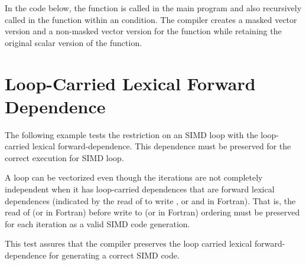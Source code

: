 


In the code below, the function  is called in the main program and 
also recursively called in the function  within an  
condition. The compiler creates a masked vector version and a non-masked vector 
version for the function  while retaining the original scalar 
version of the  function.





\section{Loop-Carried Lexical Forward Dependence}
\label{sec:SIMD_forward_dep}


 The following example tests the restriction on an SIMD loop with the loop-carried lexical forward-dependence. This dependence must be preserved for the correct execution for SIMD loop.

A loop can be vectorized even though the iterations are not completely independent when it has loop-carried dependences that are forward lexical dependences (indicated by the read of  to write , or  and  in Fortran). That is, the read of  (or  in Fortran) before write to  (or  in Fortran) ordering must be preserved for each iteration  as a valid SIMD code generation.

This test assures that the compiler preserves the loop carried lexical forward-dependence for generating a correct SIMD code.



